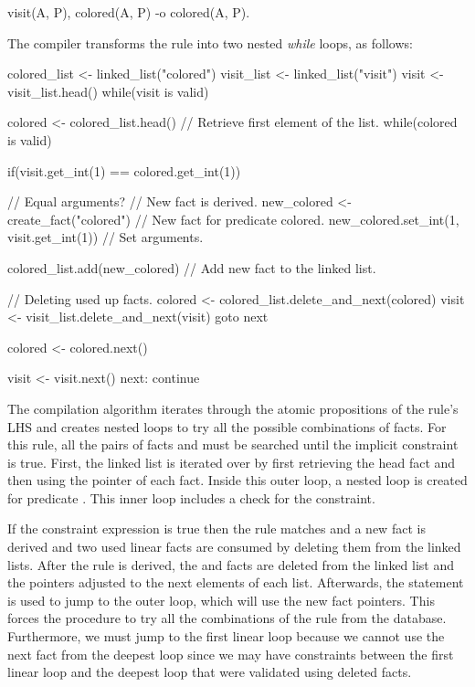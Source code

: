 \begin{Code}
visit(A, P),
colored(A, P)
   -o colored(A, P).
\end{Code}

The compiler transforms the rule into two nested \emph{while} loops, as follows:

\begin{LineCode}
colored_list <- linked_list("colored")
visit_list <- linked_list("visit")
visit <- visit_list.head()
while(visit is valid)
{
   colored <- colored_list.head() // Retrieve first element of the list.
   while(colored is valid)
   {
      if(visit.get_int(1) == colored.get_int(1)) { // Equal arguments?
         // New fact is derived.
         new_colored <- create_fact("colored") // New fact for predicate colored.
         new_colored.set_int(1, visit.get_int(1)) // Set arguments.

         colored_list.add(new_colored) // Add new fact to the linked list.

         // Deleting used up facts.
         colored <- colored_list.delete_and_next(colored)
         visit <- visit_list.delete_and_next(visit)
         goto next
      }
      colored <- colored.next()
   }
   visit <- visit.next()
next:
   continue
}
\end{LineCode}

The compilation algorithm iterates through the atomic propositions of the rule's
LHS and creates nested loops to try all the possible combinations of facts.  For
this rule, all the pairs of facts  and  must be
searched until the implicit constraint is true. First, the  linked
list is iterated over by first retrieving the head fact and then using the
 pointer of each fact. Inside this outer loop, a nested 
loop is created for predicate . This inner loop includes a check
for the constraint.

If the constraint expression is true then the rule matches and a new
 fact is derived and two used linear facts are consumed by
deleting them from the linked lists. After the rule is derived, the 
and  facts are deleted from the linked list and the pointers
adjusted to the next elements of each list. Afterwards, the 
statement is used to jump to the outer loop, which will use the new fact
pointers. This forces the procedure to try all the combinations of the rule from
the database.  Furthermore, we must jump to the first linear loop because we
cannot use the next fact from the deepest loop since we may have constraints
between the first linear loop and the deepest loop that were validated using
deleted facts.

